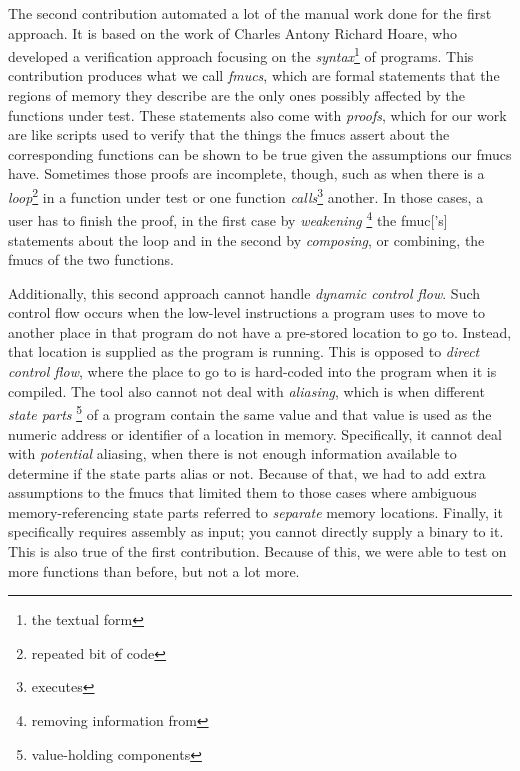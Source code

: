 {  The second contribution automated a lot of the manual work done for the first approach.
  It is based on the work of Charles Antony Richard Hoare, who developed a verification approach focusing on the \emph{syntax}\footnote{the textual form} of programs.
  This contribution produces what we call \emph{\glspl{fmuc}}, which are formal statements that the regions of memory they describe are the only ones possibly affected by the functions under test.
  These statements also come with \emph{proofs}, which for our work are like scripts used to verify that the things the \glspl{fmuc} assert about the corresponding functions can be shown to be true given the assumptions our \glspl{fmuc} have.
  Sometimes those proofs are incomplete, though, such as when there is a \emph{loop}\footnote{repeated bit of code} in a function under test or one function \emph{calls}\footnote{executes} another.
  In those cases, a user has to finish the proof, in the first case by \emph{weakening}%
  \footnote{removing information from}
  the \gls{fmuc}['s] statements about the loop and in the second by \emph{composing}, or combining, the \glspl{fmuc} of the two functions.

  Additionally, this second approach cannot handle \emph{dynamic control flow}.
  Such control flow occurs when the low-level instructions a program uses to move to another place in that program do not have a pre-stored location to go to.
  Instead, that location is supplied as the program is running.
  This is opposed to \emph{direct control flow}, where the place to go to is hard-coded into the program when it is compiled.
  The tool also cannot not deal with \emph{aliasing}, which is when different \emph{state parts}%
  \footnote{value-holding components}
  of a program contain the same value and that value is used as the numeric address or identifier of a location in memory.
  Specifically, it cannot deal with \emph{potential} aliasing, when there is not enough information available to determine if the state parts alias or not.
  Because of that, we had to add extra assumptions to the \glspl{fmuc} that limited them to those cases where ambiguous memory-referencing state parts referred to \emph{separate} memory locations.
  Finally, it specifically requires assembly as input; you cannot directly supply a binary to it.
  This is also true of the first contribution.
  Because of this, we were able to test on more functions than before, but not a lot more.

}
